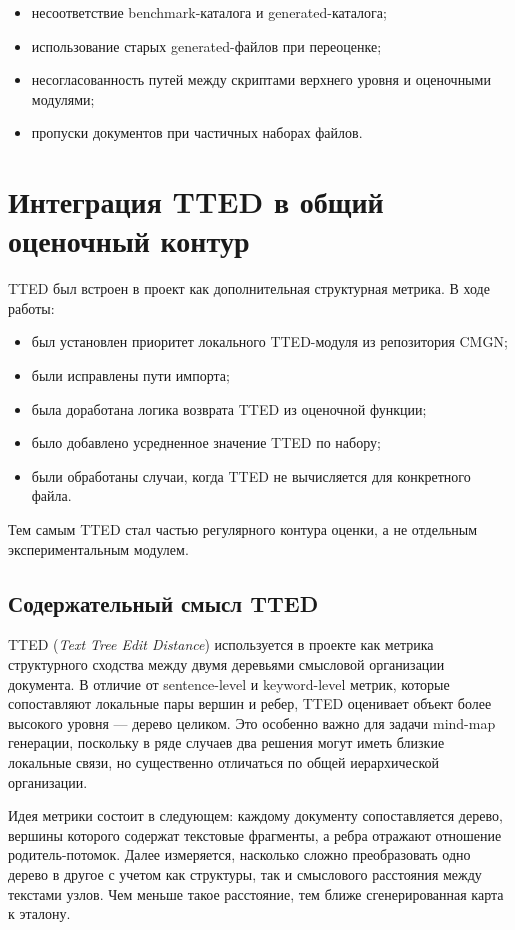 \documentclass[12pt,a4paper]{article}
\begin{document}
\begin{itemize}
    \item несоответствие benchmark-каталога и generated-каталога;
    \item использование старых generated-файлов при переоценке;
    \item несогласованность путей между скриптами верхнего уровня и оценочными модулями;
    \item пропуски документов при частичных наборах файлов.
\end{itemize}

\section{Интеграция TTED в общий оценочный контур}

TTED был встроен в проект как дополнительная структурная метрика. В ходе работы:

\begin{itemize}
    \item был установлен приоритет локального TTED-модуля из репозитория CMGN;
    \item были исправлены пути импорта;
    \item была доработана логика возврата TTED из оценочной функции;
    \item было добавлено усредненное значение TTED по набору;
    \item были обработаны случаи, когда TTED не вычисляется для конкретного файла.
\end{itemize}

Тем самым TTED стал частью регулярного контура оценки, а не отдельным экспериментальным
модулем.

\subsection{Содержательный смысл TTED}

TTED (\textit{Text Tree Edit Distance}) используется в проекте как метрика структурного
сходства между двумя деревьями смысловой организации документа. В отличие от
sentence-level и keyword-level метрик, которые сопоставляют локальные пары вершин и ребер,
TTED оценивает объект более высокого уровня --- дерево целиком. Это особенно важно для
задачи mind-map генерации, поскольку в ряде случаев два решения могут иметь близкие
локальные связи, но существенно отличаться по общей иерархической организации.

Идея метрики состоит в следующем: каждому документу сопоставляется дерево, вершины
которого содержат текстовые фрагменты, а ребра отражают отношение родитель-потомок.
Далее измеряется, насколько сложно преобразовать одно дерево в другое с учетом как
структуры, так и смыслового расстояния между текстами узлов. Чем меньше такое
расстояние, тем ближе сгенерированная карта к эталону.
\end{document}
